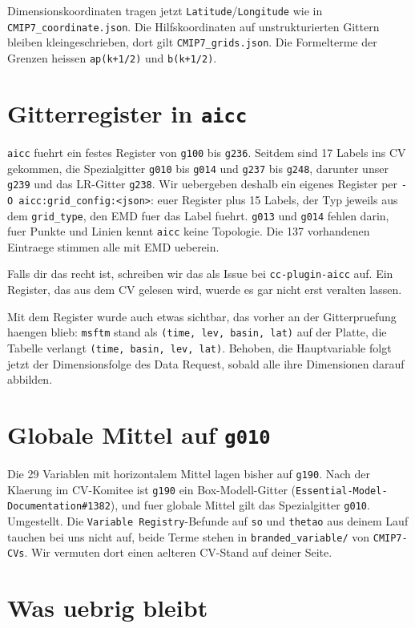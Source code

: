 \documentclass[11pt,a4paper]{article}
\newcommand{\code}[1]{\texttt{\small #1}}
\begin{document}
Dimensionskoordinaten tragen jetzt \code{Latitude}/\code{Longitude} wie in
\code{CMIP7\_coordinate.json}. Die Hilfskoordinaten auf unstrukturierten Gittern
bleiben kleingeschrieben, dort gilt \code{CMIP7\_grids.json}. Die Formelterme der
Grenzen heissen \code{ap(k+1/2)} und \code{b(k+1/2)}.

\section{Gitterregister in \code{aicc}}

\code{aicc} fuehrt ein festes Register von \code{g100} bis \code{g236}. Seitdem
sind 17 Labels ins CV gekommen, die Spezialgitter \code{g010} bis \code{g014} und
\code{g237} bis \code{g248}, darunter unser \code{g239} und das LR-Gitter
\code{g238}. Wir uebergeben deshalb ein eigenes Register per
\code{-O aicc:grid\_config:<json>}: euer Register plus 15 Labels, der Typ jeweils
aus dem \code{grid\_type}, den EMD fuer das Label fuehrt. \code{g013} und
\code{g014} fehlen darin, fuer Punkte und Linien kennt \code{aicc} keine Topologie.
Die 137 vorhandenen Eintraege stimmen alle mit EMD ueberein.

Falls dir das recht ist, schreiben wir das als Issue bei \code{cc-plugin-aicc}
auf. Ein Register, das aus dem CV gelesen wird, wuerde es gar nicht erst
veralten lassen.

Mit dem Register wurde auch etwas sichtbar, das vorher an der Gitterpruefung
haengen blieb: \code{msftm} stand als \code{(time, lev, basin, lat)} auf der
Platte, die Tabelle verlangt \code{(time, basin, lev, lat)}. Behoben, die
Hauptvariable folgt jetzt der Dimensionsfolge des Data Request, sobald alle
ihre Dimensionen darauf abbilden.

\section{Globale Mittel auf \code{g010}}

Die 29 Variablen mit horizontalem Mittel lagen bisher auf \code{g190}. Nach der
Klaerung im CV-Komitee ist \code{g190} ein Box-Modell-Gitter
(\code{Essential-Model-Documentation\#1382}), und fuer globale Mittel gilt das
Spezialgitter \code{g010}. Umgestellt. Die \code{Variable Registry}-Befunde auf
\code{so} und \code{thetao} aus deinem Lauf tauchen bei uns nicht auf, beide Terme
stehen in \code{branded\_variable/} von \code{CMIP7-CVs}. Wir vermuten dort einen
aelteren CV-Stand auf deiner Seite.

\section{Was uebrig bleibt}
\label{sec:rest}
\end{document}
